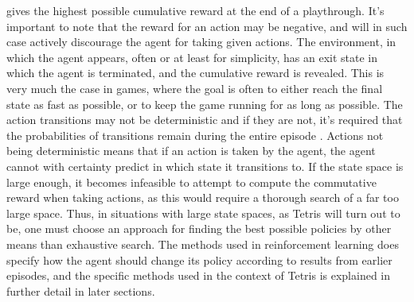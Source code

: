 gives the highest possible cumulative reward at the end of a playthrough. 
It's important to note that the reward 
for an action may be negative, and will in such case actively discourage 
the agent for taking given actions.
The environment, in which the agent appears, often 
or at least for simplicity, has an exit state
in which the agent is terminated, and the cumulative reward 
is revealed. This is very much the case in games, where the goal 
is often to either reach the final state as fast as possible,
or to keep the game running for as long as possible.
The action transitions may 
not be deterministic and if they are not,
it's required that the probabilities of transitions
remain during the entire episode \citep{Carr}. Actions not being deterministic
means that if an action is taken by the agent, the agent cannot 
with certainty predict in which state it transitions to.
If the state space 
is large enough, it becomes infeasible to attempt to compute 
the commutative reward when taking actions, as this would require
a thorough search of a far too large space. Thus, in situations 
with large state spaces, as Tetris will turn out to be, one must choose 
an approach for finding the best possible policies by other
means than exhaustive search. The methods used in reinforcement learning 
does specify how the agent should change its policy according to 
results from earlier episodes, and the specific methods used in
the context of Tetris is explained in further detail in later sections.














